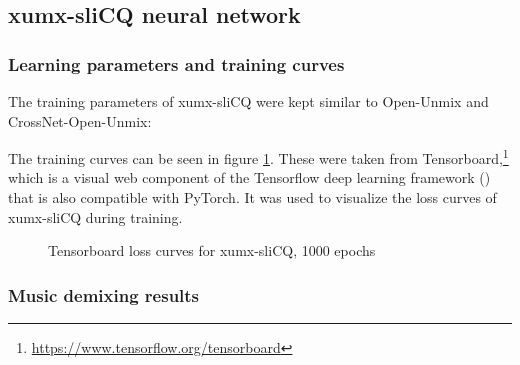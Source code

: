 \documentclass[report.tex]{subfiles}
\begin{document}
\newpagefill

\subsection{xumx-sliCQ neural network}

\subsubsection{Learning parameters and training curves}

The training parameters of xumx-sliCQ were kept similar to Open-Unmix and CrossNet-Open-Unmix:

The training curves can be seen in figure \ref{fig:networkloss}. These were taken from Tensorboard,\footnote{\url{https://www.tensorflow.org/tensorboard}} which is a visual web component of the Tensorflow deep learning framework (\cite{tensorflow}) that is also compatible with PyTorch. It was used to visualize the loss curves of xumx-sliCQ during training.

\begin{figure}[ht]
	\centering
	\hspace{0.5em}
	\caption{Tensorboard loss curves for xumx-sliCQ, 1000 epochs}
	\label{fig:networkloss}
\end{figure}

\newpagefill

\subsubsection{Music demixing results}
\label{sec:demixresults}
\end{document}
